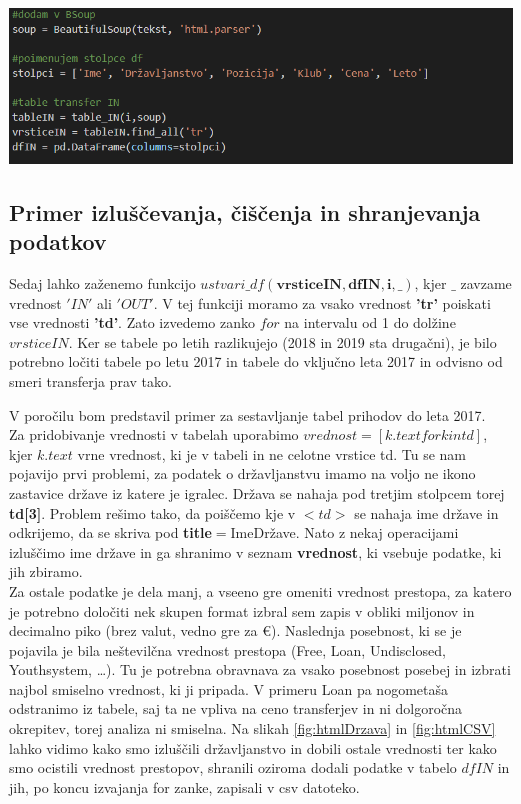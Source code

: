 \documentclass[a4paper, 12pt]{article}
\begin{document}
\includegraphics[width=\textwidth]{html2}
\label{fig:htmlVrstice}

\subsection{Primer izluščevanja, čiščenja in shranjevanja podatkov}
Sedaj lahko zaženemo funkcijo $ustvari\_df(\textbf{vrsticeIN},\textbf{dfIN},\textbf{i},\textbf{\_})$, kjer $\_$ zavzame vrednost $'IN'$ ali $'OUT'$. V tej funkciji moramo za vsako vrednost \textbf{'tr'} poiskati vse vrednosti \textbf{'td'}. Zato izvedemo zanko $for$ na intervalu od 1 do dolžine $vrsticeIN$. Ker se tabele po letih razlikujejo (2018 in 2019 sta drugačni), je bilo potrebno ločiti tabele po letu 2017 in tabele do vključno leta 2017 in odvisno od smeri transferja prav tako. \medskip
\par V poročilu bom predstavil primer za sestavljanje tabel prihodov do leta 2017.\\
Za pridobivanje vrednosti v tabelah uporabimo $vrednost=[k.text for k in td]$, kjer $k.text$ vrne vrednost, ki je v tabeli in ne celotne vrstice td. Tu se nam pojavijo prvi problemi, za podatek o državljanstvu imamo na voljo ne ikono zastavice države iz katere je igralec. Država se nahaja pod tretjim stolpcem torej \textbf{td[3]}. 
Problem rešimo tako, da poiščemo kje v $<td>$ se nahaja ime države in odkrijemo, da se skriva pod \textbf{title}$=$ImeDržave. Nato z nekaj operacijami izluščimo ime države in ga shranimo v seznam \textbf{vrednost}, ki vsebuje podatke, ki jih zbiramo. \\
Za ostale podatke je dela manj, a vseeno gre omeniti vrednost prestopa, za katero je potrebno določiti nek skupen format izbral sem zapis v obliki miljonov in decimalno piko (brez valut, vedno gre za \euro). 
Naslednja posebnost, ki se je pojavila je bila neštevilčna vrednost prestopa (Free, Loan, Undisclosed, Youthsystem, \dots). Tu je potrebna obravnava za vsako posebnost posebej in izbrati najbol smiselno vrednost, ki ji pripada. V primeru Loan pa nogometaša odstranimo iz tabele, saj ta ne vpliva na ceno transferjev in ni dolgoročna okrepitev, torej analiza ni smiselna. Na slikah \ref{fig:htmlDrzava} in \ref{fig:htmlCSV} lahko vidimo kako smo izluščili državljanstvo in dobili ostale vrednosti ter kako smo ocistili vrednost prestopov, shranili oziroma dodali podatke v tabelo $dfIN$ in jih, po koncu izvajanja for zanke, zapisali v csv datoteko.
\end{document}
